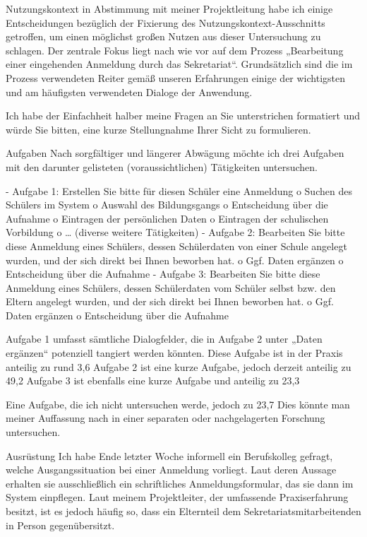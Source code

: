 Nutzungskontext
in Abstimmung mit meiner Projektleitung habe ich einige Entscheidungen bezüglich der Fixierung des Nutzungskontext-Ausschnitts getroffen, um einen möglichst großen Nutzen aus dieser Untersuchung zu schlagen.
Der zentrale Fokus liegt nach wie vor auf dem Prozess „Bearbeitung einer eingehenden Anmeldung durch das Sekretariat“. 
Grundsätzlich sind die im Prozess verwendeten Reiter gemäß unseren Erfahrungen einige der wichtigsten und am häufigsten verwendeten Dialoge der Anwendung.

Ich habe der Einfachheit halber meine Fragen an Sie unterstrichen formatiert und würde Sie bitten, eine kurze Stellungnahme Ihrer Sicht zu formulieren.

Aufgaben
Nach sorgfältiger und längerer Abwägung möchte ich drei Aufgaben mit den darunter gelisteten (voraussichtlichen) Tätigkeiten untersuchen.

-	Aufgabe 1: Erstellen Sie bitte für diesen Schüler eine Anmeldung
o	Suchen des Schülers im System
o	Auswahl des Bildungsgangs
o	Entscheidung über die Aufnahme
o	Eintragen der persönlichen Daten
o	Eintragen der schulischen Vorbildung
o	… (diverse weitere Tätigkeiten)
-	Aufgabe 2: Bearbeiten Sie bitte diese Anmeldung eines Schülers, dessen Schülerdaten von einer Schule angelegt wurden, und der sich direkt bei Ihnen beworben hat.
o	Ggf. Daten ergänzen
o	Entscheidung über die Aufnahme 
-	Aufgabe 3: Bearbeiten Sie bitte diese Anmeldung eines Schülers, dessen Schülerdaten vom Schüler selbst bzw. den Eltern angelegt wurden, und der sich direkt bei Ihnen beworben hat.
o	Ggf. Daten ergänzen
o	Entscheidung über die Aufnahme

Aufgabe 1 umfasst sämtliche Dialogfelder, die in Aufgabe 2 unter „Daten ergänzen“ potenziell tangiert werden könnten. Diese Aufgabe ist in der Praxis anteilig zu rund 3,6%
Aufgabe 2 ist eine kurze Aufgabe, jedoch derzeit anteilig zu 49,2%
Aufgabe 3 ist ebenfalls eine kurze Aufgabe und anteilig zu 23,3%

Eine Aufgabe, die ich nicht untersuchen werde, jedoch zu 23,7%
Dies könnte man meiner Auffassung nach in einer separaten oder nachgelagerten Forschung untersuchen. 

Ausrüstung
Ich habe Ende letzter Woche informell ein Berufskolleg gefragt, welche Ausgangssituation bei einer Anmeldung vorliegt. Laut deren Aussage erhalten sie ausschließlich ein schriftliches Anmeldungsformular, das sie dann im System einpflegen.
Laut meinem Projektleiter, der umfassende Praxiserfahrung besitzt, ist es jedoch häufig so, dass ein Elternteil dem Sekretariatsmitarbeitenden in Person gegenübersitzt.


